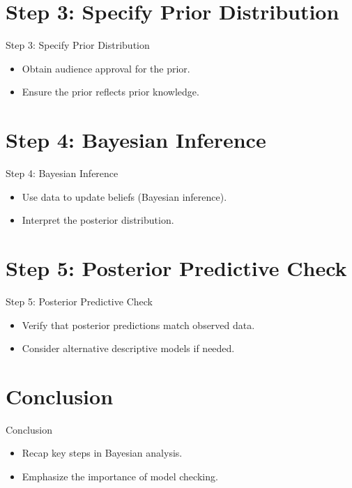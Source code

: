 \documentclass{beamer}
\begin{document}
\section{Step 3: Specify Prior Distribution}

\begin{frame}{Step 3: Specify Prior Distribution}
  \begin{itemize}
    \item Obtain audience approval for the prior.
    \item Ensure the prior reflects prior knowledge.
  \end{itemize}
\end{frame}

\section{Step 4: Bayesian Inference}

\begin{frame}{Step 4: Bayesian Inference}
  \begin{itemize}
    \item Use data to update beliefs (Bayesian inference).
    \item Interpret the posterior distribution.
  \end{itemize}
\end{frame}

\section{Step 5: Posterior Predictive Check}

\begin{frame}{Step 5: Posterior Predictive Check}
  \begin{itemize}
    \item Verify that posterior predictions match observed data.
    \item Consider alternative descriptive models if needed.
  \end{itemize}
\end{frame}

\section{Conclusion}

\begin{frame}{Conclusion}
  \begin{itemize}
    \item Recap key steps in Bayesian analysis.
    \item Emphasize the importance of model checking.
  \end{itemize}
\end{frame}
\end{document}
